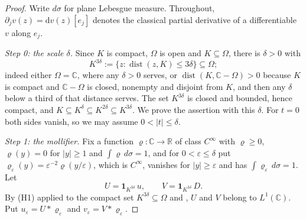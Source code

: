 \begin{proof}
Write $d\sigma$ for plane Lebesgue measure.  Throughout, $\partial_jv(z)
=\mathrm{d}v(z)[e_j]$ denotes the classical partial derivative of a
differentiable $v$ along $e_j$.

\emph{Step 0: the scale $\delta$.}  Since $K$ is compact, $\Omega$ is open and
$K\subseteq\Omega$, there is $\delta>0$ with
\[
  K^{3\delta}:=\{z:\operatorname{dist}(z,K)\le3\delta\}\subseteq\Omega ;
\]
indeed either $\Omega=\mathbb{C}$, where any $\delta>0$ serves, or
$\operatorname{dist}(K,\mathbb{C}-\Omega)>0$ because $K$ is compact and
$\mathbb{C}-\Omega$ is closed, nonempty and disjoint from $K$, and then any
$\delta$ below a third of that distance serves.  The set $K^{3\delta}$ is
closed and bounded, hence compact, and
$K\subseteq K^{\delta}\subseteq K^{2\delta}\subseteq K^{3\delta}$.  We prove
the assertion with this $\delta$.  For $t=0$ both sides vanish, so we may
assume $0<|t|\le\delta$.

\emph{Step 1: the mollifier.}  Fix a function
$\varrho\colon\mathbb{C}\to\mathbb{R}$ of class $C^\infty$ with $\varrho\ge0$,
$\varrho(y)=0$ for $|y|\ge1$ and $\int\varrho\,d\sigma=1$, and for
$0<\varepsilon\le\delta$ put
$\varrho_\varepsilon(y)=\varepsilon^{-2}\varrho(y/\varepsilon)$, which is
$C^\infty$, vanishes for $|y|\ge\varepsilon$ and has
$\int\varrho_\varepsilon\,d\sigma=1$.  Let
\[
  U=\mathbf{1}_{K^{3\delta}}\,u,\qquad V=\mathbf{1}_{K^{3\delta}}\,D .
\]
By (H1) applied to the compact set $K^{3\delta}\subseteq\Omega$ and
, $U$ and $V$ belong to $L^{1}(\mathbb{C})$.  Put
$u_\varepsilon=U*\varrho_\varepsilon$ and
$v_\varepsilon=V*\varrho_\varepsilon$.


\end{proof}

